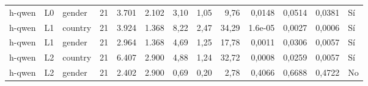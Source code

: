 \begin{landscape}
\begin{longtable}{lllrrrrrrrrrl}
h-qwen & L0 & gender & 21 & 3.701 & 2.102 & 3,10 & 1,05 & 9,76 & 0,0148 & 0,0514 & 0,0381 & Sí \\
h-qwen & L1 & country & 21 & 3.924 & 1.368 & 8,22 & 2,47 & 34,29 & 1.6e-05 & 0,0027 & 0,0006 & Sí \\
h-qwen & L1 & gender & 21 & 2.964 & 1.368 & 4,69 & 1,25 & 17,78 & 0,0011 & 0,0306 & 0,0057 & Sí \\
h-qwen & L2 & country & 21 & 6.407 & 2.900 & 4,88 & 1,24 & 32,72 & 0,0008 & 0,0259 & 0,0057 & Sí \\
h-qwen & L2 & gender & 21 & 2.402 & 2.900 & 0,69 & 0,20 & 2,78 & 0,4066 & 0,6688 & 0,4722 & No \\
\end{longtable}
\end{landscape}
